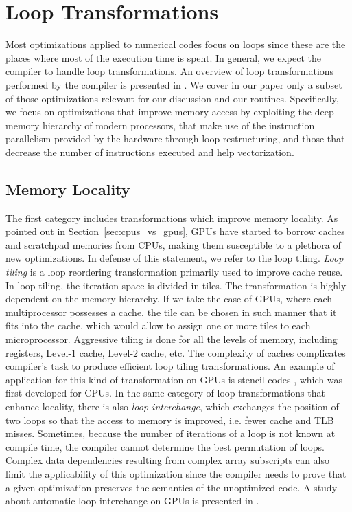 \section{Loop Transformations}
\label{sec:optimizations}

Most optimizations applied to numerical codes focus on loops since these are the
places where most of the execution time is spent. In general, we expect the
compiler to handle loop transformations. An overview of loop transformations
performed by the compiler is presented in \cite{Bacon:1994:CTH:197405.197406}.
We cover in our paper only a subset of those optimizations relevant for our
discussion and our routines. Specifically, we focus on optimizations that
improve memory access by exploiting the deep memory hierarchy of modern
processors, that make use of the instruction parallelism provided by the
hardware through loop restructuring, and those that decrease the number of
instructions executed and help vectorization.

\subsection{Memory Locality}

The first category includes transformations which improve memory locality. As
pointed out in Section~\ref{sec:cpus_vs_gpus}, GPUs have started to borrow
caches and scratchpad memories from CPUs, making them susceptible to a plethora
of new optimizations. In defense of this statement, we refer to the loop tiling.
\textit{Loop tiling} is a loop reordering transformation primarily used to
improve cache reuse. In loop tiling, the iteration space is divided in tiles.
The transformation is highly dependent on the memory hierarchy. If we take the
case of GPUs, where each multiprocessor possesses a cache, the tile can be
chosen in such manner that it fits into the cache, which would allow to assign
one or more tiles to each microprocessor. Aggressive tiling is done for all the
levels of memory, including registers, Level-1 cache, Level-2 cache, etc. The
complexity of caches complicates compiler's task to produce efficient loop
tiling transformations. An example of application for this kind of
transformation on GPUs is stencil codes \cite{volkov2010}, which was first
developed for CPUs. In the same category of loop transformations that enhance
locality, there is also \textit{loop interchange}, which exchanges the position
of two loops so that the access to memory is improved, i.e. fewer cache and TLB
misses. Sometimes, because the number of iterations of a loop is not known at
compile time, the compiler cannot determine the best permutation of loops.
Complex data dependencies resulting from complex array subscripts can also limit
the applicability of this optimization since the compiler needs to prove that a
given optimization preserves the semantics of the unoptimized code. 
A study about
automatic loop interchange on GPUs is presented in
\cite{Leung:2009:APG:1596655.1596670}.

